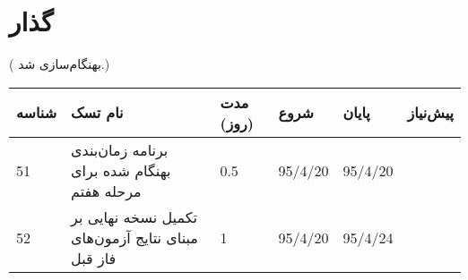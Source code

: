 \section{گذار}
({\color{red} بهنگام‌سازی شد.})

\begin{tabular}[H]{ | l | l | l | l | l | l | }
	\hline
	شناسه & نام تسک & مدت (روز) & شروع & پایان & پیش‌نیاز    \\ \hline
	51 & برنامه زمان‌بندی بهنگام شده برای مرحله هفتم & 0.5   &   95/4/20 &   95/4/20 &     \\ \hline
	52 & تکمیل نسخه نهایی بر مبنای نتایج آزمون‌های فاز قبل & 1   &   95/4/20 &   95/4/24 &     \\ \hline
	
\end{tabular}
\restoregeometry